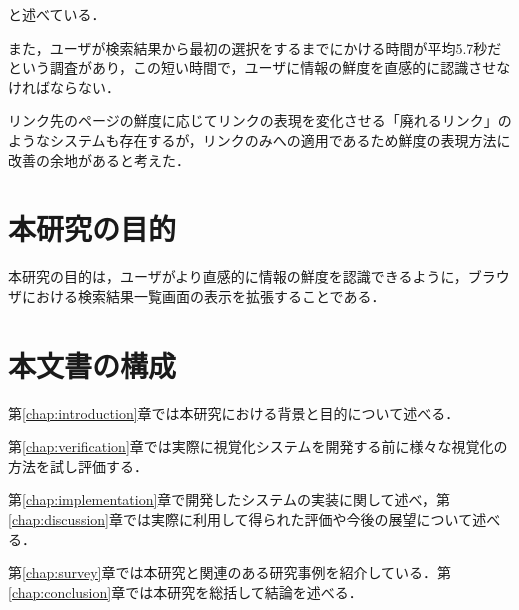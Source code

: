 と述べている．

また，ユーザが検索結果から最初の選択をするまでにかける時間が平均5.7秒だという調査\cite{pinball}があり，この短い時間で，ユーザに情報の鮮度を直感的に認識させなければならない．

リンク先のページの鮮度に応じてリンクの表現を変化させる「廃れるリンク」\cite{dyinglink}のようなシステムも存在するが，リンクのみへの適用であるため鮮度の表現方法に改善の余地があると考えた．

\section{本研究の目的}

本研究の目的は，ユーザがより直感的に情報の鮮度を認識できるように，ブラウザにおける検索結果一覧画面の表示を拡張することである．

\section{本文書の構成}

第\ref{chap:introduction}章では本研究における背景と目的について述べる．

第\ref{chap:verification}章では実際に視覚化システムを開発する前に様々な視覚化の方法を試し評価する．

第\ref{chap:implementation}章で開発したシステムの実装に関して述べ，第\ref{chap:discussion}章では実際に利用して得られた評価や今後の展望について述べる．

第\ref{chap:survey}章では本研究と関連のある研究事例を紹介している．第\ref{chap:conclusion}章では本研究を総括して結論を述べる．
